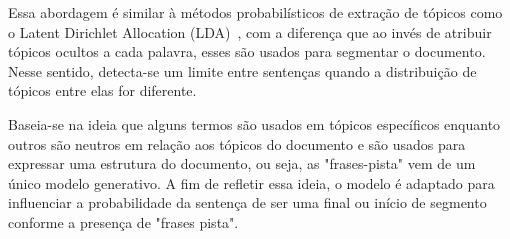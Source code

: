 Essa abordagem é similar à métodos probabilísticos de extração de tópicos como o Latent Dirichlet Allocation (LDA)~\cite{Blei2003}, com a diferença que ao invés de atribuir tópicos ocultos a cada palavra, esses são usados para segmentar o documento. Nesse sentido, detecta-se um limite entre sentenças quando a distribuição de tópicos entre elas for diferente.

Baseia-se na ideia que alguns termos são usados em tópicos específicos enquanto outros são neutros em relação aos tópicos do documento e são usados para expressar uma estrutura do documento, ou seja, as "frases-pista" vem de um único modelo generativo. A fim de refletir essa ideia, o modelo é adaptado para influenciar a probabilidade da sentença de ser uma final ou início de segmento conforme a presença de "frases pista".











